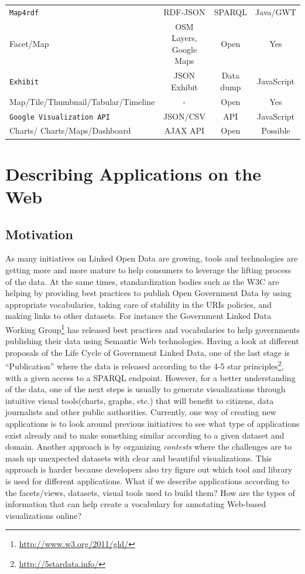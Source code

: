 \begin{landscape}
\begin{table}[htb!]
\begin{tabular}{lccc}
    \midrule
    \texttt{Map4rdf} & RDF-JSON & SPARQL & Java/GWT \\
    Facet/Map & OSM Layers, Google Maps & Open & Yes \\
    \midrule
    \texttt{Exhibit} & JSON Exhibit & Data dump & JavaScript \\
    Map/Tile/Thumbnail/Tabular/Timeline & \-- & Open & Yes \\
    \midrule
    \texttt{Google Visualization API} & JSON/CSV & API & JavaScript \\
    Charts/ Charts/Maps/Dashboard & AJAX API & Open & Possible \\
    \bottomrule
  \end{tabular}
\end{table}
\end{landscape}

\section{Describing Applications on the Web}
 \label{sec:descApps}

 \subsection{Motivation}
As many initiatives on Linked Open Data are growing, tools and technologies are getting more and more mature to help consumers to leverage the lifting process of the data. At the same times, standardization bodies such as the W3C are helping by providing best practices to publish Open Government Data by using appropriate vocabularies, taking care of stability in the URIs policies, and making links to other datasets. For instance the Government Linked Data Working Group\footnote{\url{http://www.w3.org/2011/gld/}} has released best practices and vocabularies to help governments publishing their data using Semantic Web technologies. Having a look at different proposals of the Life Cycle of Government Linked Data, one of the last stage is ``Publication'' where the data is released according to the 4-5 star principles\footnote{\url{http://5stardata.info/}}, with a given access to a SPARQL endpoint. However, for a better understanding of the data, one of the next steps is usually to generate visualizations through intuitive visual tools(charts, graphs, etc.) that will benefit to citizens, data journalists and other public authorities. Currently, one way of creating new applications is to look around previous initiatives to see what type of applications exist already and to make something similar according to a given dataset and domain. Another approach is by organizing \textit{contests} where the challenges are to mash up unexpected datasets with clear and beautiful visualizations. This approach is harder because developers also try figure out which tool and library is used for different applications. What if we describe applications according to the facets/views, datasets, visual tools used to build them? How are the types of information that can help create a vocabulary for annotating Web-based visualizations online?

